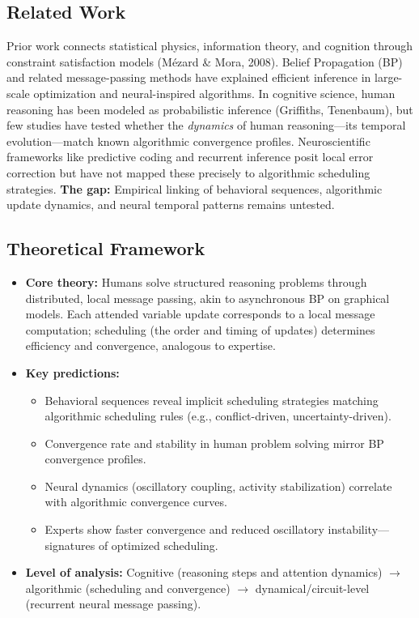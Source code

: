     \subsection{Related Work}
        Prior work connects statistical physics, information theory, and cognition through constraint satisfaction models (Mézard \& Mora, 2008).  
        Belief Propagation (BP) and related message-passing methods have explained efficient inference in large-scale optimization and neural-inspired algorithms.  
        In cognitive science, human reasoning has been modeled as probabilistic inference (Griffiths, Tenenbaum), but few studies have tested whether the \emph{dynamics} of human reasoning—its temporal evolution—match known algorithmic convergence profiles.  
        Neuroscientific frameworks like predictive coding and recurrent inference posit local error correction but have not mapped these precisely to algorithmic scheduling strategies.  
        \textbf{The gap:} Empirical linking of behavioral sequences, algorithmic update dynamics, and neural temporal patterns remains untested.

    \subsection{Theoretical Framework}
        \begin{itemize}
            \item \textbf{Core theory:} Humans solve structured reasoning problems through distributed, local message passing, akin to asynchronous BP on graphical models. Each attended variable update corresponds to a local message computation; scheduling (the order and timing of updates) determines efficiency and convergence, analogous to expertise.
            \item \textbf{Key predictions:}
                  \begin{itemize}
                      \item Behavioral sequences reveal implicit scheduling strategies matching algorithmic scheduling rules (e.g., conflict-driven, uncertainty-driven).
                      \item Convergence rate and stability in human problem solving mirror BP convergence profiles.
                      \item Neural dynamics (oscillatory coupling, activity stabilization) correlate with algorithmic convergence curves.
                      \item Experts show faster convergence and reduced oscillatory instability—signatures of optimized scheduling.
                  \end{itemize}
            \item \textbf{Level of analysis:} Cognitive (reasoning steps and attention dynamics) $\rightarrow$ algorithmic (scheduling and convergence) $\rightarrow$ dynamical/circuit-level (recurrent neural message passing).
        \end{itemize}
    
